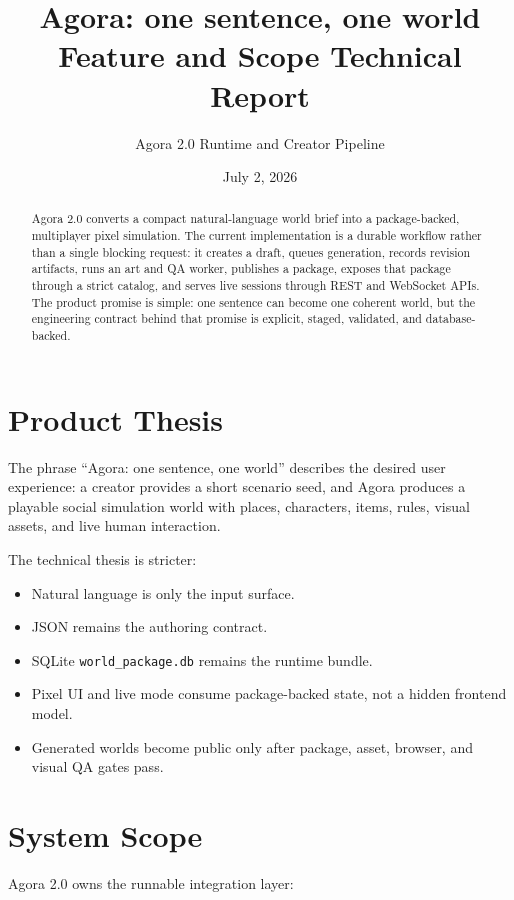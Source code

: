 \documentclass[11pt]{article}
\title{\textbf{Agora: one sentence, one world}\\
\large Feature and Scope Technical Report}
\author{Agora 2.0 Runtime and Creator Pipeline}
\date{July 2, 2026}
\begin{document}
\maketitle

\begin{abstract}
Agora 2.0 converts a compact natural-language world brief into a package-backed, multiplayer pixel simulation. The current implementation is a durable workflow rather than a single blocking request: it creates a draft, queues generation, records revision artifacts, runs an art and QA worker, publishes a package, exposes that package through a strict catalog, and serves live sessions through REST and WebSocket APIs. The product promise is simple: one sentence can become one coherent world, but the engineering contract behind that promise is explicit, staged, validated, and database-backed.
\end{abstract}

\section{Product Thesis}

The phrase ``Agora: one sentence, one world'' describes the desired user experience: a creator provides a short scenario seed, and Agora produces a playable social simulation world with places, characters, items, rules, visual assets, and live human interaction.

The technical thesis is stricter:

\begin{itemize}
  \item Natural language is only the input surface.
  \item JSON remains the authoring contract.
  \item SQLite \texttt{world\_package.db} remains the runtime bundle.
  \item Pixel UI and live mode consume package-backed state, not a hidden frontend model.
  \item Generated worlds become public only after package, asset, browser, and visual QA gates pass.
\end{itemize}

\section{System Scope}

Agora 2.0 owns the runnable integration layer:
\end{document}
